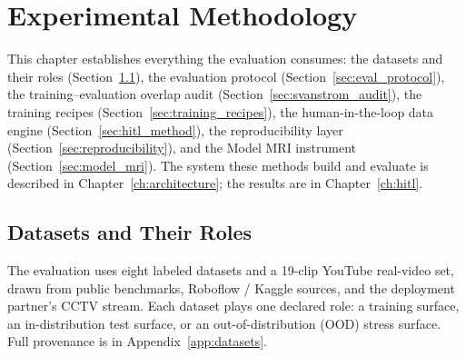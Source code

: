 \chapter{Experimental Methodology}
\label{ch:methodology}

This chapter establishes everything the evaluation consumes: the datasets and their roles (Section~\ref{sec:datasets}), the evaluation protocol (Section~\ref{sec:eval_protocol}), the training--evaluation overlap audit (Section~\ref{sec:svanstrom_audit}), the training recipes (Section~\ref{sec:training_recipes}), the human-in-the-loop data engine (Section~\ref{sec:hitl_method}), the reproducibility layer (Section~\ref{sec:reproducibility}), and the Model MRI instrument (Section~\ref{sec:model_mri}). The system these methods build and evaluate is described in Chapter~\ref{ch:architecture}; the results are in Chapter~\ref{ch:hitl}.

\section{Datasets and Their Roles}
\label{sec:datasets}

The evaluation uses eight labeled datasets and a 19-clip YouTube real-video set, drawn from public benchmarks, Roboflow / Kaggle sources, and the deployment partner's CCTV stream. Each dataset plays one declared role: a training surface, an in-distribution test surface, or an out-of-distribution (OOD) stress surface. Full provenance is in Appendix~\ref{app:datasets}.

